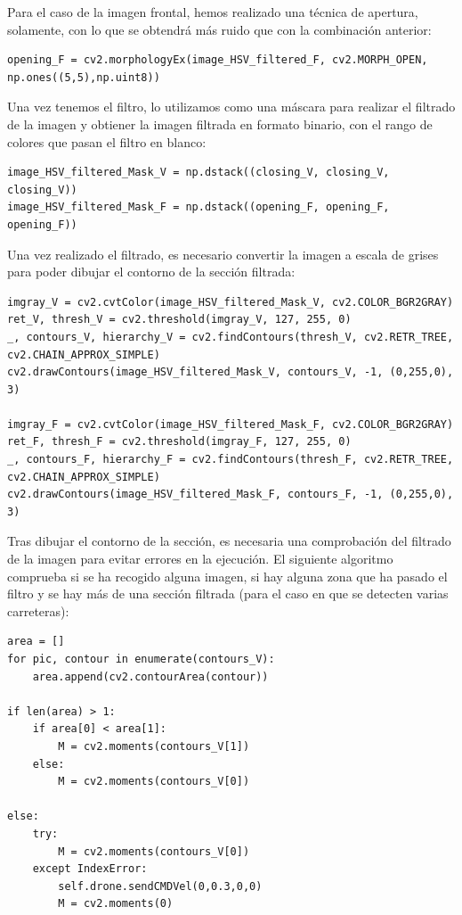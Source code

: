 Para el caso de la imagen frontal, hemos realizado una técnica de apertura, solamente, con lo que se obtendrá más ruido que con la combinación anterior:

\lstset{language=Python, breaklines=true, basicstyle=\footnotesize}
\begin{lstlisting}[frame=single]
opening_F = cv2.morphologyEx(image_HSV_filtered_F, cv2.MORPH_OPEN, np.ones((5,5),np.uint8))
\end{lstlisting}

Una vez tenemos el filtro, lo utilizamos como una máscara para realizar el filtrado de la imagen y obtiener la imagen filtrada en formato binario, con el rango de colores que pasan el filtro en blanco:

\lstset{language=Python, breaklines=true, basicstyle=\footnotesize}
\begin{lstlisting}[frame=single]
image_HSV_filtered_Mask_V = np.dstack((closing_V, closing_V, closing_V))
image_HSV_filtered_Mask_F = np.dstack((opening_F, opening_F, opening_F))
\end{lstlisting}

Una vez realizado el filtrado, es necesario convertir la imagen a escala de grises para poder dibujar el contorno de la sección filtrada:

\lstset{language=Python, breaklines=true, basicstyle=\footnotesize}
\begin{lstlisting}[frame=single]
imgray_V = cv2.cvtColor(image_HSV_filtered_Mask_V, cv2.COLOR_BGR2GRAY)
ret_V, thresh_V = cv2.threshold(imgray_V, 127, 255, 0)
_, contours_V, hierarchy_V = cv2.findContours(thresh_V, cv2.RETR_TREE, cv2.CHAIN_APPROX_SIMPLE)
cv2.drawContours(image_HSV_filtered_Mask_V, contours_V, -1, (0,255,0), 3)

imgray_F = cv2.cvtColor(image_HSV_filtered_Mask_F, cv2.COLOR_BGR2GRAY)
ret_F, thresh_F = cv2.threshold(imgray_F, 127, 255, 0)
_, contours_F, hierarchy_F = cv2.findContours(thresh_F, cv2.RETR_TREE, cv2.CHAIN_APPROX_SIMPLE)
cv2.drawContours(image_HSV_filtered_Mask_F, contours_F, -1, (0,255,0), 3)
\end{lstlisting}

Tras dibujar el contorno de la sección, es necesaria una comprobación del filtrado de la imagen para evitar errores en la ejecución. El siguiente algoritmo comprueba si se ha recogido alguna imagen, si hay alguna zona que ha pasado el filtro y se hay más de una sección filtrada (para el caso en que se detecten varias carreteras):

\lstset{language=Python, breaklines=true, basicstyle=\footnotesize}
\begin{lstlisting}[frame=single]
area = []
for pic, contour in enumerate(contours_V):
    area.append(cv2.contourArea(contour))

if len(area) > 1:
    if area[0] < area[1]:
        M = cv2.moments(contours_V[1])
    else:
        M = cv2.moments(contours_V[0])

else:
    try:
        M = cv2.moments(contours_V[0])
    except IndexError:
        self.drone.sendCMDVel(0,0.3,0,0)
        M = cv2.moments(0)
\end{lstlisting}

